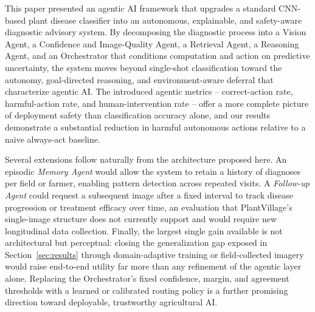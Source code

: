 \documentclass[conference]{IEEEtran}
\begin{document}
This paper presented an agentic AI framework that upgrades a standard CNN-based plant disease classifier into an autonomous, explainable, and safety-aware diagnostic advisory system. By decomposing the diagnostic process into a Vision Agent, a Confidence and Image-Quality Agent, a Retrieval Agent, a Reasoning Agent, and an Orchestrator that conditions computation and action on predictive uncertainty, the system moves beyond single-shot classification toward the autonomy, goal-directed reasoning, and environment-aware deferral that characterize agentic AI. The introduced agentic metrics -- correct-action rate, harmful-action rate, and human-intervention rate -- offer a more complete picture of deployment safety than classification accuracy alone, and our results demonstrate a substantial reduction in harmful autonomous actions relative to a naive always-act baseline.

Several extensions follow naturally from the architecture proposed here. An episodic \emph{Memory Agent} would allow the system to retain a history of diagnoses per field or farmer, enabling pattern detection across repeated visits. A \emph{Follow-up Agent} could request a subsequent image after a fixed interval to track disease progression or treatment efficacy over time, an evaluation that PlantVillage's single-image structure does not currently support and would require new longitudinal data collection. Finally, the largest single gain available is not architectural but perceptual: closing the generalization gap exposed in Section~\ref{sec:results} through domain-adaptive training or field-collected imagery would raise end-to-end utility far more than any refinement of the agentic layer alone. Replacing the Orchestrator's fixed confidence, margin, and agreement thresholds with a learned or calibrated routing policy is a further promising direction toward deployable, trustworthy agricultural AI.



\end{document}
